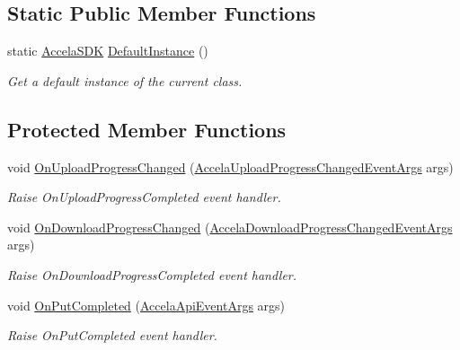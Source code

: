 \subsection*{Static Public Member Functions}
\begin{DoxyCompactItemize}
\item 
static \hyperlink{class_accela_1_1_windows_store_s_d_k_1_1_accela_s_d_k}{Accela\+S\+D\+K} \hyperlink{class_accela_1_1_windows_store_s_d_k_1_1_accela_s_d_k_a96130b809777f1c7deb843e4ec7bd1ba}{Default\+Instance} ()
\begin{DoxyCompactList}\small\item\em Get a default instance of the current class. \end{DoxyCompactList}\end{DoxyCompactItemize}
\subsection*{Protected Member Functions}
\begin{DoxyCompactItemize}
\item 
void \hyperlink{class_accela_1_1_windows_store_s_d_k_1_1_accela_s_d_k_ae0bd11ec759b8dc478fa44aad20b4b93}{On\+Upload\+Progress\+Changed} (\hyperlink{class_accela_1_1_windows_store_s_d_k_1_1_accela_upload_progress_changed_event_args}{Accela\+Upload\+Progress\+Changed\+Event\+Args} args)
\begin{DoxyCompactList}\small\item\em Raise On\+Upload\+Progress\+Completed event handler. \end{DoxyCompactList}\item 
void \hyperlink{class_accela_1_1_windows_store_s_d_k_1_1_accela_s_d_k_a46d55ff85ac1fec986eccefcdbbf6a6b}{On\+Download\+Progress\+Changed} (\hyperlink{class_accela_1_1_windows_store_s_d_k_1_1_accela_download_progress_changed_event_args}{Accela\+Download\+Progress\+Changed\+Event\+Args} args)
\begin{DoxyCompactList}\small\item\em Raise On\+Download\+Progress\+Completed event handler. \end{DoxyCompactList}\item 
void \hyperlink{class_accela_1_1_windows_store_s_d_k_1_1_accela_s_d_k_aaa98096c1e2d72925e31c82811828e33}{On\+Put\+Completed} (\hyperlink{class_accela_1_1_windows_store_s_d_k_1_1_accela_api_event_args}{Accela\+Api\+Event\+Args} args)
\begin{DoxyCompactList}\small\item\em Raise On\+Put\+Completed event handler. \end{DoxyCompactList}\end{DoxyCompactItemize}
